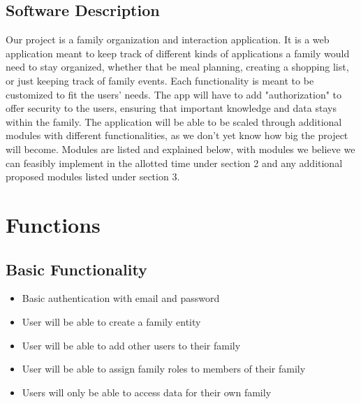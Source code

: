 \documentclass[12pt]{article}
\begin{document}
\subsection{Software Description}
Our project is a family organization and interaction application. It is a web application meant to keep track of different 
kinds of applications a family would need to stay organized, whether that be meal planning, creating a shopping list, or just keeping track of 
family events. Each functionality is meant to be customized to fit the users' needs. The app will have to add "authorization" to offer security to the users, ensuring that important knowledge and data stays within the family. The application will be able to be scaled through additional modules with different functionalities, as we don't yet know how big the project will become. Modules are listed and explained below, with modules we believe we can feasibly implement
in the allotted time under section 2 and any additional proposed modules listed under section 3.

\section{Functions}
\subsection{Basic Functionality}
\begin{itemize}
    \item Basic authentication with email and password
    \item User will be able to create a family entity
    \item User will be able to add other users to their family
    \item User will be able to assign family roles to members of their family
    \item Users will only be able to access data for their own family
\end{itemize}
\end{document}
